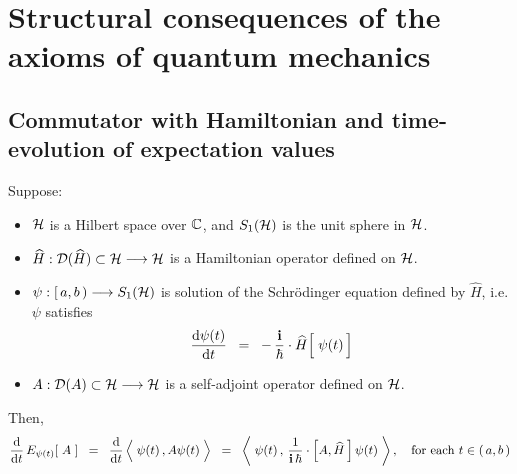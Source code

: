 

\section{Structural consequences of the axioms of quantum mechanics}
\setcounter{theorem}{0}
\setcounter{equation}{0}


\renewcommand{\theenumi}{\roman{enumi}}
\renewcommand{\labelenumi}{\textnormal{(\theenumi)}$\;\;$}


\vskip 0.5cm
\subsection{Commutator with Hamiltonian and time-evolution of expectation values}

\begin{proposition}
\mbox{}
\vskip 0.1cm
\noindent
Suppose:
\begin{itemize}
\item
	$\mathcal{H}$ is a Hilbert space over $\mathbb{C}$,
	and $S_{1}(\mathcal{H})$ is the unit sphere in $\mathcal{H}$.
\item
	$\widehat{H} : \mathcal{D}(\widehat{H}) \subset \mathcal{H} \longrightarrow \mathcal{H}$
	is a Hamiltonian operator defined on $\mathcal{H}$.
\item
	$\psi : [\,a,b\,) \longrightarrow S_{1}(\mathcal{H})$ is solution of the Schr\"{o}dinger equation defined by $\widehat{H}$, i.e.
	$\psi$ satisfies
	\begin{equation*}
	\dfrac{\d\psi(t)}{\d t}
	\;\; = \;\;
		-\,\dfrac{\i}{\hbar}\cdot\widehat{H}\!\left[\;\overset{{\color{white}.}}{\psi(t)}\,\right]
	\end{equation*}
\item
	$A : \mathcal{D}(A) \subset \mathcal{H} \longrightarrow \mathcal{H}$
	is a self-adjoint operator defined on $\mathcal{H}$.
\end{itemize}
Then,
\begin{equation*}
\dfrac{\d}{\d t}\, E_{\psi(t)}\!\left[\;A\;\right]
\;\; = \;\;
	\dfrac{\d}{\d t} \left\langle\; \psi(t) \,, A\psi(\overset{{\color{white}.}}{t})\;\right\rangle
\;\; = \;\;
	\left\langle\;
		\psi(t)
		\,,\,
		\dfrac{1}{\i\,\hbar}\cdot\left[A,\widehat{H}\,\right]\psi(t)
		\;\right\rangle,
\quad
\textnormal{for each $t \in (\,a,b\,)$}
\end{equation*}
\end{proposition}

